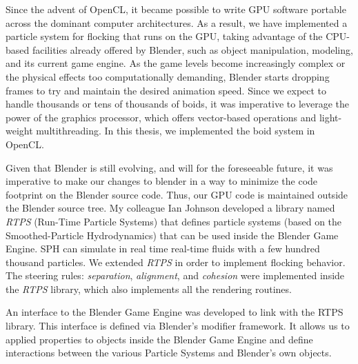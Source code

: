 Since the advent of OpenCL\cite{opencl}, it became possible to write GPU software portable across the dominant computer architectures. As a result, we have implemented a particle system for flocking that runs on the GPU, taking advantage of the CPU-based facilities already offered by Blender, such as object manipulation, modeling, and its current game engine. As the game levels  become increasingly complex or the physical effects too computationally demanding, Blender starts dropping frames to try and maintain the desired animation speed. Since we expect to handle thousands or tens of thousands of boids, it was imperative to leverage the power of the graphics processor\cite{nvidiaGPU}, which offers vector-based operations and light-weight multithreading. In this thesis, we implemented the boid system in OpenCL.



Given that Blender is still evolving, and will for the foreseeable future, it was imperative to make our changes to blender in a way to minimize the code footprint on the Blender source code. Thus, our
GPU code is maintained outside the Blender source tree. My colleague Ian Johnson\cite{ianBlog} developed a library named \textit{RTPS} (Run-Time Particle Systems) that defines particle systems (based on the Smoothed-Particle Hydrodynamics) that can be used inside the Blender Game Engine. SPH can simulate in real time real-time fluids with a few hundred thousand particles. 
We extended \textit{RTPS} in order to implement flocking behavior. The steering rules: \textit{separation}, \textit{alignment}, and \textit{cohesion} were implemented inside the \textit{RTPS} library, which also implements all the rendering routines.



An interface to the Blender Game Engine was developed to link with the RTPS library. This interface is defined via Blender's modifier framework. It allows us to applied properties to objects inside the Blender Game Engine and define interactions between the various Particle Systems and Blender's own objects.


